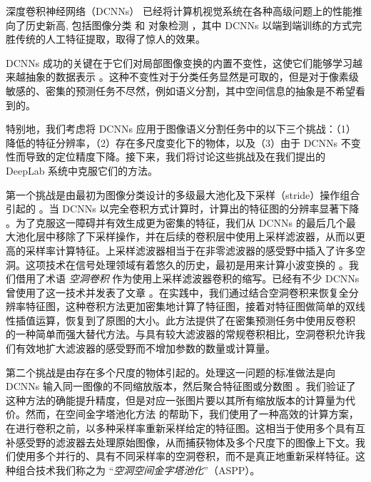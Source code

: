 
深度卷积神经网络（DCNNs） \cite{LeCun1998} 已经将计算机视觉系统在各种高级问题上的性能推向了历史新高, 包括图像分类 \cite{KrizhevskyNIPS2013, sermanet2013overfeat, simonyan2014very, szegedy2014going, papandreou2014untangling} 和 对象检测 \cite{girshick2014rcnn, erhan2014scalable, girshick2015fast, ren2015faster, he2015deep, liu2015ssd}，其中 DCNNs 以端到端训练的方式完胜传统的人工特征提取，取得了惊人的效果。

DCNNs 成功的关键在于它们对局部图像变换的内置不变性，这使它们能够学习越来越抽象的数据表示 \cite{zeiler2014visualizing}。这种不变性对于分类任务显然是可取的，但是对于像素级敏感的、密集的预测任务不尽然，例如语义分割，其中空间信息的抽象是不希望看到的。

特别地，我们考虑将 DCNNs 应用于图像语义分割任务中的以下三个挑战：（1）降低的特征分辨率，（2）存在多尺度变化下的物体，以及（3）由于 DCNNs 不变性而导致的定位精度下降。接下来，我们将讨论这些挑战及在我们提出的 DeepLab 系统中克服它们的方法。

第一个挑战是由最初为图像分类设计的多级最大池化及下采样（stride）操作组合引起的 \cite{KrizhevskyNIPS2013, simonyan2014very, szegedy2014going}。当 DCNNs 以完全卷积方式计算时，计算出的特征图的分辨率显著下降 \cite{long2014fully}。为了克服这一障碍并有效生成更为密集的特征，我们从 DCNNs 的最后几个最大池化层中移除了下采样操作，并在后续的卷积层中使用上采样滤波器，从而以更高的采样率计算特征。上采样滤波器相当于在非零滤波器的感受野中插入了许多空洞。这项技术在信号处理领域有着悠久的历史，最初是用来计算小波变换的 \cite{holschneider1989real}。我们借用了术语 \textit{空洞卷积} 作为使用上采样滤波器卷积的缩写。已经有不少 DCNNs 曾使用了这一技术并发表了文章 \cite{giusti2013fast, sermanet2013overfeat, papandreou2014untangling}。在实践中，我们通过结合空洞卷积来恢复全分辨率特征图，这种卷积方法更加密集地计算了特征图，接着对特征图做简单的双线性插值运算，恢复到了原图的大小。此方法提供了在密集预测任务中使用反卷积 \cite{zeiler2014visualizing, long2014fully} 的一种简单而强大替代方法。与具有较大滤波器的常规卷积相比，空洞卷积允许我们有效地扩大滤波器的感受野而不增加参数的数量或计算量。

第二个挑战是由存在多个尺度的物体引起的。处理这一问题的标准做法是向 DCNNs 输入同一图像的不同缩放版本，然后聚合特征图或分数图 \cite{papandreou2014untangling, chen2015attention,kokkinos2016pushing}。我们验证了这种方法的确能提升精度，但是对应一张图片要以其所有缩放版本的计算量为代价。然而，在空间金字塔池化方法 \cite{lazebnik2006beyond, he2014spatial} 的帮助下，我们使用了一种高效的计算方案，在进行卷积之前，以多种采样率重新采样给定的特征图。这相当于使用多个具有互补感受野的滤波器去处理原始图像，从而捕获物体及多个尺度下的图像上下文。我们使用多个并行的、具有不同采样率的空洞卷积，而不是真正地重新采样特征。这种组合技术我们称之为 ``\textit{空洞空间金字塔池化}''（ASPP）。


